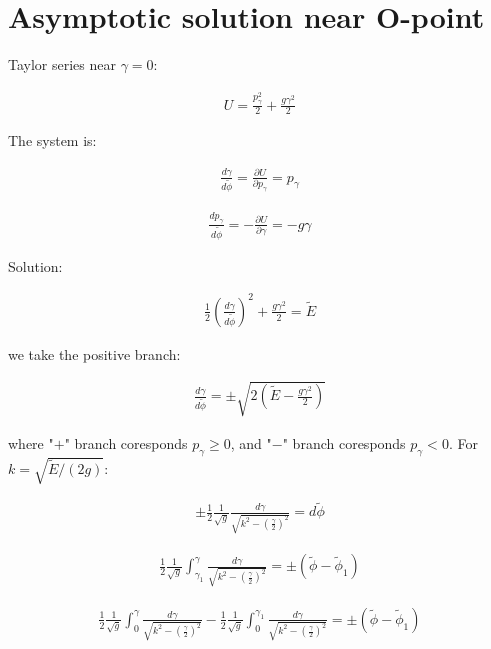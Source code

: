 \documentclass[11pt,a4paper,oneside]{article}
\begin{document}
\section{Asymptotic solution near O-point}

Taylor series near $\gamma = 0$:

\begin{align}
U=\frac{p_\gamma^2}{2}+\frac{g\gamma^2}{2}
\end{align}

The system is:

\begin{align}
\frac{d \gamma}{d\tilde{\phi}}=\frac{\partial U}{\partial p_\gamma}=p_\gamma
\end{align}

\begin{align}
\frac{d p_\gamma}{d\tilde{\phi}}=-\frac{\partial U}{\partial \gamma}=-g\gamma
\end{align}

Solution:

\begin{align}
\frac{1}{2}\left(\frac{d \gamma}{d\tilde{\phi}}\right)^2+\frac{g\gamma^2}{2}=\tilde{E}
\end{align}

we take the positive branch:

\begin{align}
\frac{d \gamma}{d\tilde{\phi}}=\pm\sqrt{2\left(\tilde{E}-\frac{g\gamma^2}{2}\right)}
\end{align}

where "$+$" branch coresponds $p_\gamma\ge 0$, and "$-$" branch coresponds $p_\gamma<0$. For $k=\sqrt{\tilde{E}/(2g)}$:

\begin{align}
\pm\frac{1}{2}\frac{1}{\sqrt{g}}\frac{d \gamma}{\sqrt{k^2-\left(\frac{\gamma}{2}\right)^2}}=d\tilde{\phi}
\end{align}

\begin{align}
\frac{1}{2}\frac{1}{\sqrt{g}}\int_{\gamma_1}^\gamma\frac{d \gamma}{\sqrt{k^2-\left(\frac{\gamma}{2}\right)^2}}=\pm(\tilde{\phi}-\tilde{\phi}_1)
\end{align}


\begin{align}
\frac{1}{2}\frac{1}{\sqrt{g}}\int_{0}^\gamma\frac{d \gamma}{\sqrt{k^2-\left(\frac{\gamma}{2}\right)^2}}-\frac{1}{2}\frac{1}{\sqrt{g}}\int_0^{\gamma_1}\frac{d \gamma}{\sqrt{k^2-\left(\frac{\gamma}{2}\right)^2}}=\pm(\tilde{\phi}-\tilde{\phi}_1)
\end{align}
\end{document}
